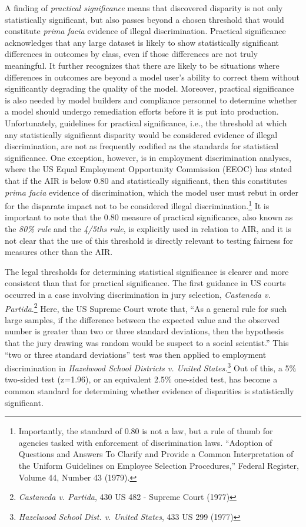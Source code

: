 \documentclass[information,article,submit,moreauthors,pdftex]{definitions/mdpi}
\begin{document}
A finding of \textit{practical significance} means that discovered disparity is not only statistically significant, but also passes beyond a chosen threshold that would constitute \textit{prima facia} evidence of illegal discrimination.  Practical significance acknowledges that any large dataset is likely to show statistically significant differences in outcomes by class, even if those differences are not truly meaningful.  It further recognizes that there are likely to be situations where differences in outcomes are beyond a model user’s ability to correct them without significantly degrading the quality of the model. Moreover, practical significance is also needed by model builders and compliance personnel to determine whether a model should undergo remediation efforts before it is put into production. Unfortunately, guidelines for practical significance, i.e., the threshold at which any statistically significant disparity would be considered evidence of illegal discrimination, are not as frequently codified as the standards for statistical significance.  One exception, however, is in employment discrimination analyses, where the US Equal Employment Opportunity Commission (EEOC) has stated that if the AIR is below 0.80 and statistically significant, then this constitutes \textit{prima facia} evidence of discrimination, which the model user must rebut in order for the disparate impact not to be considered illegal discrimination.\footnote{Importantly, the standard of 0.80 is not a law, but a rule of thumb for agencies tasked with enforcement of discrimination laws.  ``Adoption of Questions and Answers To Clarify and Provide a Common Interpretation of the Uniform Guidelines on Employee Selection Procedures,'' Federal Register, Volume 44, Number 43 (1979).} It is important to note that the 0.80 measure of practical significance, also known as the \textit{80\% rule} and the \textit{4/5ths rule}, is explicitly used in relation to AIR, and it is not clear that the use of this threshold is directly relevant to testing fairness for measures other than the AIR.

The legal thresholds for determining statistical significance is clearer and more consistent than that for practical significance.  The first guidance in US courts occurred in a case involving discrimination in jury selection, \textit{Castaneda v. Partida}.\footnote{\textit{Castaneda v. Partida}, 430 US 482 - Supreme Court (1977)}   Here, the US Supreme Court wrote that, ``As a general rule for such large samples, if the difference between the expected value and the observed number is greater than two or three standard deviations, then the hypothesis that the jury drawing was random would be suspect to a social scientist.''  This ``two or three standard deviations'' test was then applied to employment discrimination in \textit{Hazelwood School Districts v. United States.}\footnote{\textit{Hazelwood School Dist. v. United States}, 433 US 299 (1977)} Out of this, a 5\% two-sided test (z=1.96), or an equivalent 2.5\% one-sided test, has become a common standard for determining whether evidence of disparities is statistically significant.
\end{document}
